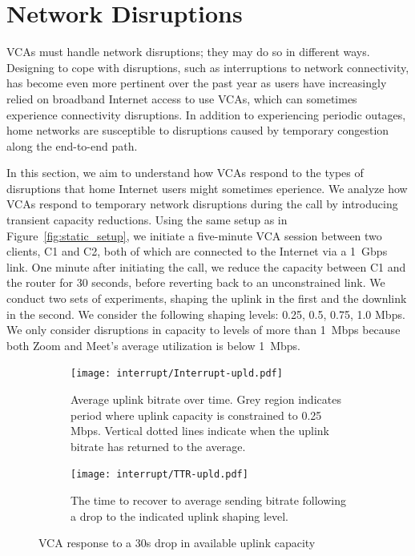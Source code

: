 

\section{Network Disruptions}
\label{sec:interruption}

VCAs must handle network disruptions; they may do so in different ways.
Designing to cope with disruptions, such as interruptions to network
connectivity, has become even more pertinent over the past year as users have
increasingly relied on broadband Internet access to use VCAs, which can
sometimes experience connectivity disruptions.  In addition to experiencing
periodic outages, home networks are susceptible to disruptions caused by
temporary congestion along the end-to-end path.

In this section, we aim to understand how VCAs respond to the types of
disruptions that home Internet users might sometimes eperience. We analyze how
VCAs respond to temporary network disruptions during the call by introducing
transient capacity reductions. Using the same setup as in
Figure~\ref{fig:static_setup}, we initiate a five-minute VCA session between
two clients, C1 and C2, both of which are connected to the Internet via a
1~Gbps link. One minute after initiating the call, we reduce the capacity
between C1 and the router for 30 seconds, before reverting back to an
unconstrained link. We conduct two sets of experiments, shaping the uplink in
the first and the downlink in the second. We consider the following shaping
levels: {0.25, 0.5, 0.75, 1.0} Mbps. We only consider disruptions in capacity
to levels of more than 1~Mbps because both Zoom and Meet's average utilization
is below 1~Mbps.

\begin{figure}[t!]
\centering
\begin{subfigure}[t]{.5\textwidth}
    \centering
    \texttt{[image: interrupt/Interrupt-upld.pdf]}
    \caption{Average uplink bitrate over time. Grey region indicates period where uplink capacity is constrained to 0.25 Mbps. Vertical dotted lines indicate when the uplink bitrate has returned to the average.}
    \label{fig:ts_upld}
\end{subfigure}\hfill
\begin{subfigure}[t]{.5\textwidth}
      \centering
    \texttt{[image: interrupt/TTR-upld.pdf]}
    \caption{The time to recover to average sending bitrate following a drop to the indicated uplink shaping level.}
    \label{fig:TTR_upld}
\end{subfigure}
\caption{VCA response to a 30s drop in available uplink capacity}
\label{fig:interrupt-upld}
\end{figure}

